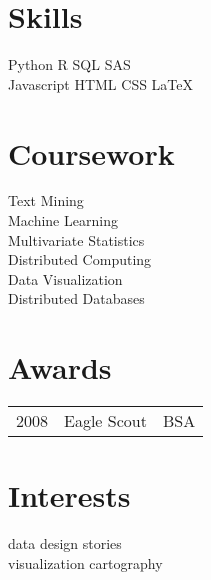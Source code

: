\documentclass[]{deedy-resume-openfont}
\begin{document}
\begin{minipage}[t]{0.33\textwidth}

\section{Skills}
Python \textbullet{} R \textbullet{} SQL \textbullet{} SAS \textbullet{} \\
Javascript \textbullet{} HTML \textbullet{} CSS \textbullet{} \LaTeX\ \\ 
\sectionsep


\section{Coursework}
Text Mining \\
Machine Learning \\
Multivariate Statistics \\
Distributed Computing \\
Data Visualization \\
Distributed Databases \\
\sectionsep



\section{Awards} 
\begin{tabular}{rll}
	2008 & Eagle Scout & BSA \\
\end{tabular}
\sectionsep


\section{Interests}
data \textbullet{} design \textbullet{} stories \textbullet{} \\
visualization \textbullet{} cartography 


%
%

\end{minipage} 
\hfill
\end{document}
